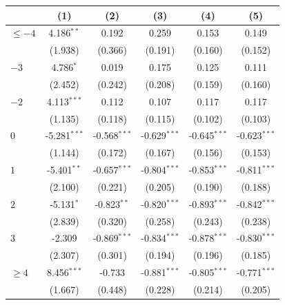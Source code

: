 
\begingroup
\centering
\begin{tabular}{lccccc}
   \toprule
                        & (1)            & (2)            & (3)            & (4)            & (5)\\  
   \midrule 
   $\leq -4$            & 4.186$^{**}$   & 0.192          & 0.259          & 0.153          & 0.149\\   
                        & (1.938)        & (0.366)        & (0.191)        & (0.160)        & (0.152)\\   
   $-3$                 & 4.786$^{*}$    & 0.019          & 0.175          & 0.125          & 0.111\\   
                        & (2.452)        & (0.242)        & (0.208)        & (0.159)        & (0.160)\\   
   $-2$                 & 4.113$^{***}$  & 0.112          & 0.107          & 0.117          & 0.117\\   
                        & (1.135)        & (0.118)        & (0.115)        & (0.102)        & (0.103)\\   
   $0$                  & -5.281$^{***}$ & -0.568$^{***}$ & -0.629$^{***}$ & -0.645$^{***}$ & -0.623$^{***}$\\   
                        & (1.144)        & (0.172)        & (0.167)        & (0.156)        & (0.153)\\   
   $1$                  & -5.401$^{**}$  & -0.657$^{***}$ & -0.804$^{***}$ & -0.853$^{***}$ & -0.811$^{***}$\\   
                        & (2.100)        & (0.221)        & (0.205)        & (0.190)        & (0.188)\\   
   $2$                  & -5.131$^{*}$   & -0.823$^{**}$  & -0.820$^{***}$ & -0.893$^{***}$ & -0.842$^{***}$\\   
                        & (2.839)        & (0.320)        & (0.258)        & (0.243)        & (0.238)\\   
   $3$                  & -2.309         & -0.869$^{***}$ & -0.834$^{***}$ & -0.878$^{***}$ & -0.830$^{***}$\\   
                        & (2.307)        & (0.301)        & (0.194)        & (0.196)        & (0.185)\\   
   $\geq 4$             & 8.456$^{***}$  & -0.733         & -0.881$^{***}$ & -0.805$^{***}$ & -0.771$^{***}$\\   
                        & (1.667)        & (0.448)        & (0.228)        & (0.214)        & (0.205)\\   

\end{tabular}
